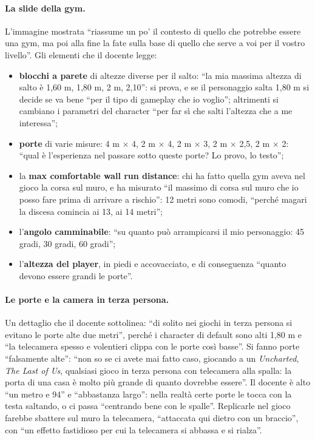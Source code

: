 \paragraph{La slide della gym.} L'immagine mostrata ``riassume un po' il contesto di quello
che potrebbe essere una gym, ma poi alla fine la fate sulla base di quello che serve a voi
per il vostro livello''. Gli elementi che il docente legge:
\begin{itemize}
  \item \textbf{blocchi a parete} di altezze diverse per il salto: ``la mia massima altezza
        di salto è 1,60 m, 1,80 m, 2 m, 2,10'': si prova, e se il personaggio salta 1,80
        m si decide se va bene ``per il tipo di gameplay che io voglio''; altrimenti si
        cambiano i parametri del character ``per far sì che salti l'altezza che a me
        interessa'';
  \item \textbf{porte} di varie misure: 4 m $\times$ 4, 2 m $\times$ 4, 2 m $\times$ 3, 2 m
        $\times$ 2,5, 2 m $\times$ 2: ``qual è l'esperienza nel passare sotto queste
        porte? Lo provo, lo testo'';
  \item la \textbf{max comfortable wall run distance}: chi ha fatto quella gym aveva nel
        gioco la corsa sul muro, e ha misurato ``il massimo di corsa sul muro che io posso
        fare prima di arrivare a rischio'': 12 metri sono comodi, ``perché magari la
        discesa comincia ai 13, ai 14 metri'';
  \item l'\textbf{angolo camminabile}: ``su quanto può arrampicarsi il mio personaggio: 45
        gradi, 30 gradi, 60 gradi'';
  \item l'\textbf{altezza del player}, in piedi e accovacciato, e di conseguenza ``quanto
        devono essere grandi le porte''.
\end{itemize}

\paragraph{Le porte e la camera in terza persona.} Un dettaglio che il docente sottolinea:
``di solito nei giochi in terza persona si evitano le porte alte due metri'', perché i
character di default sono alti 1,80 m e ``la telecamera spesso e volentieri clippa con le
porte così basse''. Si fanno porte ``falsamente alte'': ``non so se ci avete mai fatto caso,
giocando a un \emph{Uncharted}, \emph{The Last of Us}, qualsiasi gioco in terza persona con
telecamera alla spalla: la porta di una casa è molto più grande di quanto dovrebbe essere''.
Il docente è alto ``un metro e 94'' e ``abbastanza largo'': nella realtà certe porte le tocca
con la testa saltando, o ci passa ``centrando bene con le spalle''. Replicarle nel gioco
farebbe sbattere sul muro la telecamera, ``attaccata qui dietro con un braccio'', con
``un effetto fastidioso per cui la telecamera si abbassa e si rialza''.


